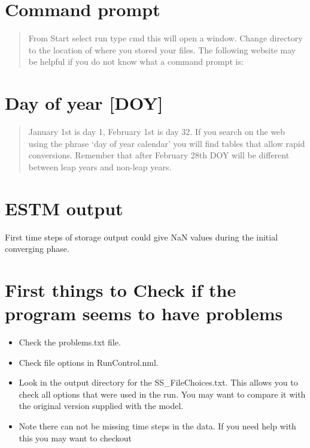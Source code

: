\documentclass[letterpaper,10pt,english]{sphinxmanual}
\begin{document}
\section{Command prompt}
\label{\detokenize{troubleshooting:command-prompt}}\begin{quote}

From Start select run \textendash{}type cmd \textendash{} this will open a window. Change
directory to the location of where you stored your files. The
following website may be helpful if you do not know what a command
prompt is: 
\end{quote}


\section{Day of year {[}DOY{]}}
\label{\detokenize{troubleshooting:day-of-year-doy}}\begin{quote}

January 1st is day 1, February 1st is day 32. If you search on the
web using the phrase ‘day of year calendar’ you will find tables
that allow rapid conversions. Remember that after February 28th DOY
will be different between leap years and non-leap years.
\end{quote}


\section{ESTM output}
\label{\detokenize{troubleshooting:estm-output}}
First time steps of storage output could give NaN values during the
initial converging phase.


\section{First things to Check if the program seems to have problems}
\label{\detokenize{troubleshooting:first-things-to-check-if-the-program-seems-to-have-problems}}\begin{itemize}
\item {} 
Check the problems.txt file.

\item {} 
Check file options \textendash{} in RunControl.nml.

\item {} 
Look in the output directory for the SS\_FileChoices.txt. This allows
you to check all options that were used in the run. You may want to
compare it with the original version supplied with the model.

\item {} 
Note there can not be missing time steps in the data. If you need
help with this you may want to checkout

\end{itemize}
\end{document}
